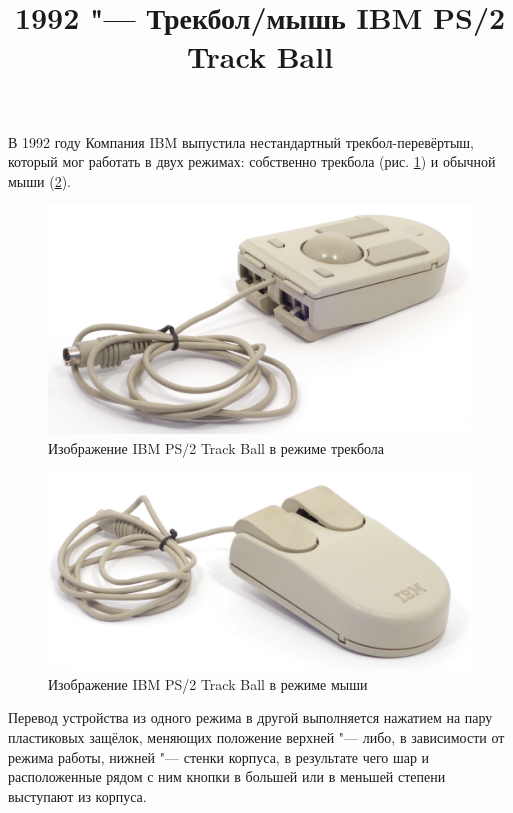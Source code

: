 \documentclass[11pt, a4paper]{article}
\begin{document}
\title{1992 "--- Трекбол/мышь IBM PS/2 Track Ball}
\date{}
\maketitle
В 1992 году Компания IBM выпустила нестандартный трекбол-перевёртыш, который мог работать в двух режимах: собственно трекбола (рис. \ref{fig:IBMConvertibleTrackball}) и обычной мыши (\ref{fig:IBMConvertibleMouse}).

\begin{figure}[h]
    \centering
    \includegraphics[scale=0.5]{1992_ibm_convertible/picball_60}
    \caption{Изображение IBM PS/2 Track Ball в режиме трекбола}
    \label{fig:IBMConvertibleTrackball}
\end{figure}

\begin{figure}[h]
    \centering
    \includegraphics[scale=0.5]{1992_ibm_convertible/picmouse_60}
    \caption{Изображение IBM PS/2 Track Ball в режиме мыши}
    \label{fig:IBMConvertibleMouse}
\end{figure}

Перевод устройства из одного режима в другой выполняется нажатием на пару пластиковых защёлок, меняющих положение верхней "--- либо, в зависимости от режима работы, нижней "--- стенки корпуса, в результате чего шар и расположенные рядом с ним кнопки в большей или в меньшей степени выступают из корпуса.
\end{document}
